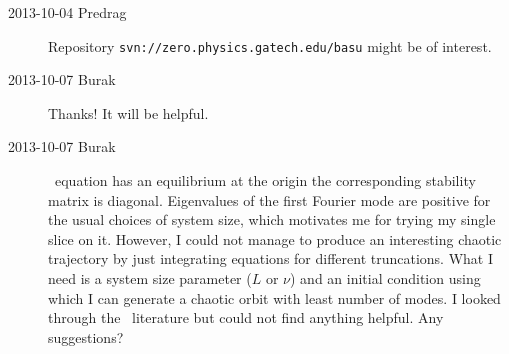 \begin{description}
\item[2013-10-04 Predrag]
Repository \texttt{svn://zero.physics.gatech.edu/basu} might be of interest.

\item[2013-10-07 Burak] Thanks! It will be helpful.

\item[2013-10-07 Burak] \KS\ equation has an equilibrium at the origin the
corresponding stability matrix is diagonal. Eigenvalues of the first Fourier
mode are positive for the usual choices of system size, which motivates me 
for trying my single slice on it. However, I could not manage to produce an
interesting chaotic trajectory by just integrating equations for different 
truncations. What I need is a system size parameter ($L$ or $\nu$) and an
initial condition using which I can generate a chaotic orbit with least 
number of modes. I looked through the \KS\ literature but could not find 
anything helpful. Any suggestions?

\end{description}
\renewcommand{\ssp}{a}
